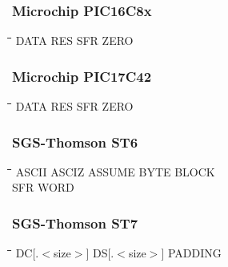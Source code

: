 \subsubsection{Microchip PIC16C8x}
{\tt\begin{tabbing}
\hspace{3cm}\=\hspace{3cm}\=\hspace{3cm}\=\hspace{3cm}\=\kill
DATA       \> RES         \> SFR         \> ZERO \\
\end{tabbing}}

\subsubsection{Microchip PIC17C42}
{\tt\begin{tabbing}
\hspace{3cm}\=\hspace{3cm}\=\hspace{3cm}\=\hspace{3cm}\=\kill
DATA       \> RES         \> SFR         \> ZERO \\
\end{tabbing}}

\subsubsection{SGS-Thomson ST6}
{\tt\begin{tabbing}
\hspace{3cm}\=\hspace{3cm}\=\hspace{3cm}\=\hspace{3cm}\=\kill
ASCII      \> ASCIZ       \> ASSUME      \> BYTE        \> BLOCK \\
SFR        \> WORD \\
\end{tabbing}}

\subsubsection{SGS-Thomson ST7}
{\tt\begin{tabbing}
\hspace{3cm}\=\hspace{3cm}\=\hspace{3cm}\=\hspace{3cm}\=\kill
DC[.$<$size$>$] \> DS[.$<$size$>$]   \> PADDING \\
\end{tabbing}}

